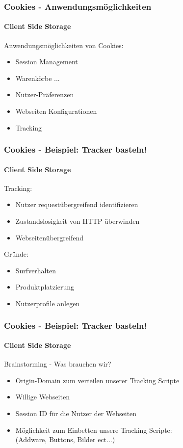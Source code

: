 
\begin{frame}
\frametitle{Cookies - Anwendungsmöglichkeiten}
\framesubtitle{Client Side Storage}

	Anwendungsmöglichkeiten von Cookies:
	\begin{itemize}
		\item Session Management
		\item Warenkörbe ...
		\item Nutzer-Präferenzen
		\item Webseiten Konfigurationen
		\item Tracking
	\end{itemize}
\end{frame}


\begin{frame}
\frametitle{Cookies - Beispiel: Tracker basteln!	 }
\framesubtitle{Client Side Storage}

	Tracking:
	\begin{itemize}
		\item Nutzer requestübergreifend identifizieren
		\item Zustandslosigkeit von HTTP überwinden
		\item Webseitenübergreifend
	\end{itemize}
	Gründe:
	\begin{itemize}
		\item Surfverhalten
		\item Produktplatzierung
		\item Nutzerprofile anlegen
	\end{itemize}
\end{frame}

\begin{frame}
\frametitle{Cookies - Beispiel: Tracker basteln!	 }
\framesubtitle{Client Side Storage}

	Brainstorming - Was brauchen wir?
	\begin{itemize}
		\item Origin-Domain zum verteilen unserer Tracking Scripte \\
		\item Willige Webseiten 
		\item Session ID für die Nutzer der Webseiten
		\item Möglichkeit zum Einbetten unsere Tracking Scripte: \\
			(Addware, Buttons, Bilder ect...)
	\end{itemize}
\end{frame}


